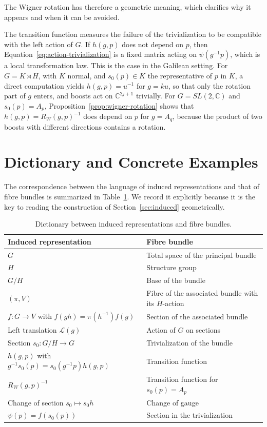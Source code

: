 	The Wigner rotation has therefore a geometric meaning, which clarifies why it appears and when it can be avoided.
	
	\begin{remark}\label{rem:wigner-geometric-meaning}
		The transition function measures the failure of the trivialization to be compatible with the left action of $G$. If $h(g,p)$ does not depend on $p$, then Equation~\eqref{eq:action-trivialization} is a fixed matrix acting on $\psi(g^{-1}p)$, which is a local transformation law. This is the case in the Galilean setting. For $G=K\rtimes H$, with $K$ normal, and $s_0(p)\in K$ the representative of $p$ in $K$, a direct computation yields $h(g,p)=u^{-1}$ for $g=ku$, so that only the rotation part of $g$ enters, and boosts act on $\mathbb{C}^{2j+1}$ trivially. For $G=SL(2,\mathbb{C})$ and $s_0(p)=A_p$, Proposition~\ref{prop:wigner-rotation} shows that $h(g,p)=R_W(g,p)^{-1}$ does depend on $p$ for $g=A_q$, because the product of two boosts with different directions contains a rotation.
	\end{remark}
	
	\section{Dictionary and Concrete Examples}
	\label{sec:induced-dictionary}
	
	The correspondence between the language of induced representations and that of fibre bundles is summarized in Table~\ref{tab:dictionary}. We record it explicitly because it is the key to reading the construction of Section~\ref{sec:induced} geometrically.
	
	\begin{table}[h]
		\centering
		\begin{tabular}{ll}
			\hline
			\textbf{Induced representation} & \textbf{Fibre bundle} \\
			\hline
			$G$ & Total space of the principal bundle \\
			$H$ & Structure group \\
			$G/H$ & Base of the bundle \\
			$(\pi,V)$ & Fibre of the associated bundle with its $H$-action \\
			$f:G\to V$ with $f(gh)=\pi(h^{-1})f(g)$ & Section of the associated bundle \\
			Left translation $\mathcal{L}(g)$ & Action of $G$ on sections \\
			Section $s_0:G/H\to G$ & Trivialization of the bundle \\
			$h(g,p)$ with $g^{-1}s_0(p)=s_0(g^{-1}p)h(g,p)$ & Transition function \\
			$R_W(g,p)^{-1}$ & Transition function for $s_0(p)=A_p$ \\
			Change of section $s_0\mapsto s_0h$ & Change of gauge \\
			$\psi(p)=f(s_0(p))$ & Section in the trivialization \\
			\hline
		\end{tabular}
		\caption{Dictionary between induced representations and fibre bundles.}
		\label{tab:dictionary}
	\end{table}
	
